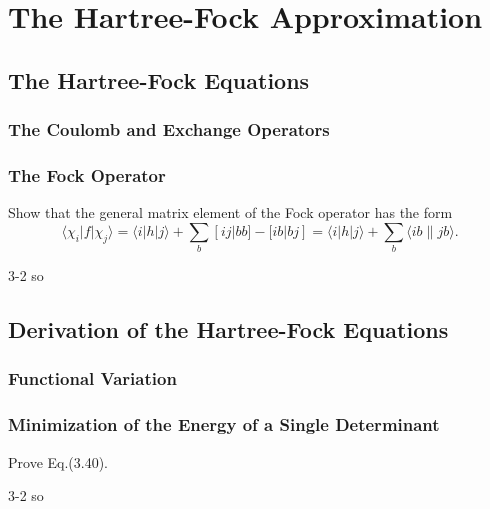 \documentclass[a4paper]{book}
\newcommand\lr[2]{\langle#1\|#2\rangle}
\begin{document}

	\chapter{The Hartree-Fock Approximation}
	
	\section{The Hartree-Fock Equations}
	
	\subsection{The Coulomb and Exchange Operators}
	
	\subsection{The Fock Operator}
	
	\begin{exercise}
	Show that the general matrix element of the Fock operator has the form
	\[
		\langle \chi_i | f | \chi_j \rangle = \langle i | h | j \rangle + \sum_b [ij|bb] - [ib|bj] = \langle i | h | j \rangle + \sum_b \lr{ib}{jb}.
	\]
	\end{exercise}
	
	\begin{solution}
		3-2 so
	\end{solution}
	
	\section{Derivation of the Hartree-Fock Equations}
	
	\subsection{Functional Variation}
	
	\subsection{Minimization of the Energy of a Single Determinant}

	\begin{exercise}
	Prove Eq.(3.40).
	\end{exercise}
	
	\begin{solution}
		3-2 so
	\end{solution}
	
\end{document}
